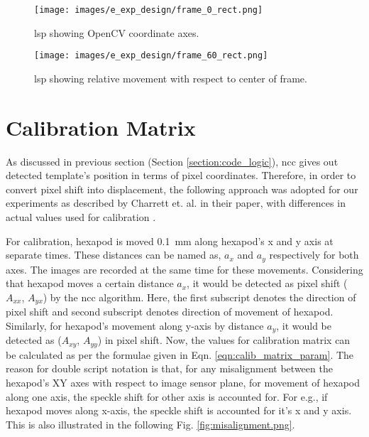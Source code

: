         \begin{figure}[h]
            \centering
            \texttt{[image: images/e\_exp\_design/frame\_0\_rect.png]}
            \caption{\gls{lsp} showing OpenCV coordinate axes.}
            \label{fig:frame_0_rect.png}
        \end{figure}
        
        \begin{figure}[h]
            \centering
            \texttt{[image: images/e\_exp\_design/frame\_60\_rect.png]}
            \caption{\gls{lsp} showing relative movement with respect to center of frame.}
            \label{fig:frame_60_rect.png}
        \end{figure}

\vspace{5mm}

\section{Calibration Matrix}\label{section:calibration}
As discussed in previous section (Section \ref{section:code_logic}), \gls{ncc} gives out detected template's position in terms of pixel coordinates. Therefore, in order to convert pixel shift into displacement, the following approach was adopted for our experiments as described by Charrett et. al. in their paper, with differences in actual values used for calibration \cite{charrett_2018}.

\vspace{5mm}

\noindent For calibration, hexapod is moved \SI{0.1}{\milli\meter} along hexapod's x and y axis at separate times. These distances can be named as, $a_x$ and $a_y$ respectively for both axes. The images are recorded at the same time for these movements. Considering that hexapod moves a certain distance $a_x$, it would be detected as pixel shift ($A_{xx}$, $A_{yx}$) by the \gls{ncc} algorithm. Here, the first subscript denotes the direction of pixel shift and second subscript denotes direction of movement of hexapod. Similarly, for hexapod's movement along y-axis by distance $a_y$, it would be detected as ($A_{xy}$, $A_{yy}$) in pixel shift. Now, the values for calibration matrix can be calculated as per the formulae given in Eqn. \ref{eqn:calib_matrix_param}. The reason for double script notation is that, for any misalignment between the hexapod's XY axes with respect to image sensor plane, for movement of hexapod along one axis, the speckle shift for other axis is accounted for. For e.g., if hexapod moves along x-axis, the speckle shift is accounted for it's x and y axis. This is also illustrated in the following Fig. \ref{fig:misalignment.png}.


